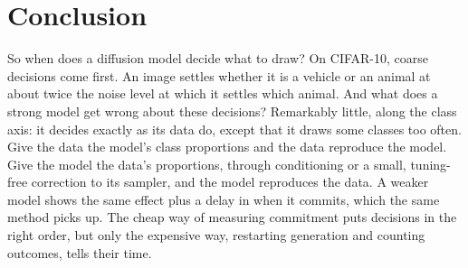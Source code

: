 \documentclass[11pt]{article}
\begin{document}
\section{Conclusion}

So when does a diffusion model decide what to draw? On CIFAR-10, coarse decisions come first. An image settles whether it is a vehicle or an animal at about twice the noise level at which it settles which animal. And what does a strong model get wrong about these decisions? Remarkably little, along the class axis: it decides exactly as its data do, except that it draws some classes too often. Give the data the model's class proportions and the data reproduce the model. Give the model the data's proportions, through conditioning or a small, tuning-free correction to its sampler, and the model reproduces the data. A weaker model shows the same effect plus a delay in when it commits, which the same method picks up. The cheap way of measuring commitment puts decisions in the right order, but only the expensive way, restarting generation and counting outcomes, tells their time.





\end{document}
